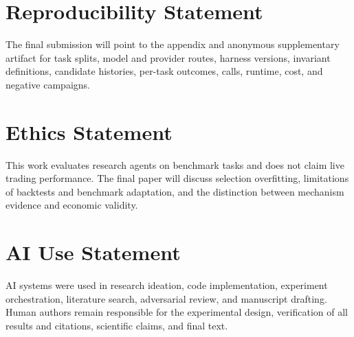 \section*{Reproducibility Statement}

The final submission will point to the appendix and anonymous supplementary
artifact for task splits, model and provider routes, harness versions,
invariant definitions, candidate histories, per-task outcomes, calls, runtime,
cost, and negative campaigns. 

\section*{Ethics Statement}

This work evaluates research agents on benchmark tasks and does not claim live
trading performance. The final paper will discuss selection overfitting,
limitations of backtests and benchmark adaptation, and the distinction between
mechanism evidence and economic validity.

\section*{AI Use Statement}

AI systems were used in research ideation, code implementation, experiment
orchestration, literature search, adversarial review, and manuscript drafting.
Human authors remain responsible for the experimental design, verification of
all results and citations, scientific claims, and final text. 
